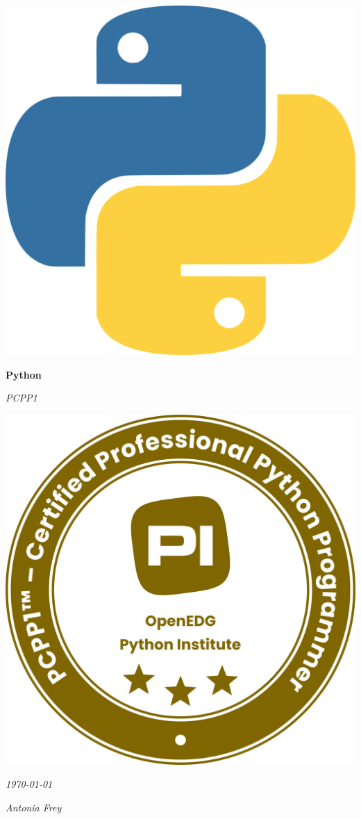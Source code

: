 \documentclass[11pt,a4paper,titlepage]{article}
\begin{document}
\begin{titlepage}
    \centering
    \vspace*{2cm}
    \includegraphics[width=0.2\linewidth]{images/python.png}\par
    \vspace{0.6cm}
    {\Huge\bfseries Python\par}
    \vspace{0.3cm}
    {\Large\itshape PCPP1\par}
    \vspace{1cm}
    \vfill
    \includegraphics[width=0.35\linewidth]{images/badge.png}\par
    \vspace{5cm}
    {\large\itshape \today\par}
    {\large\itshape Antonia Frey\par}
    \vspace*{2cm}
\end{titlepage}

\setcounter{tocdepth}{2} %
\tableofcontents
\newpage







\end{document}
